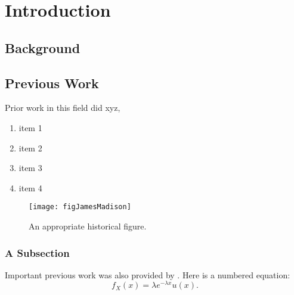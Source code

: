 

\chapter[Introduction]{Introduction}

\section{Background}
\section{Previous Work} %

Prior work in this field did xyz,

\begin{enumerate}
  \item item 1
  
  \item item 2
  
  \item item 3
  
  \item item 4 
\end{enumerate}


\begin{figure}
  \centering
  \texttt{[image: figJamesMadison]}
  \caption[An appropriate historical figure]{An appropriate historical figure.}

  \figSpace
\end{figure}

\subsection{A Subsection}

Important previous work was also provided by \cite{Shannon49}.  Here is a numbered equation:
\begin{equation}
    f_X(x) = \lambda e^{-\lambda x} u(x).
\end{equation}

